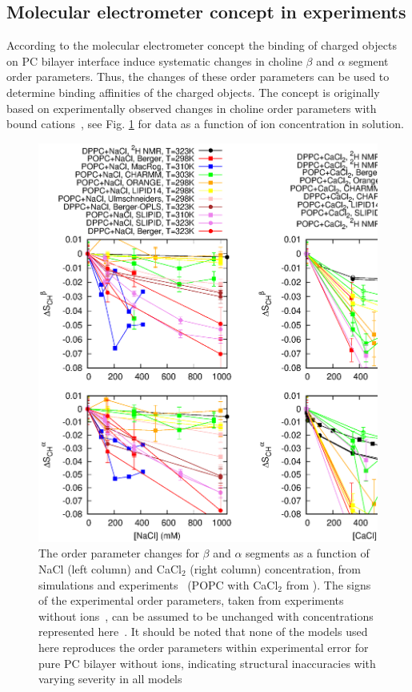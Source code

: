 \documentclass[pre,aps,floatfix,authordate1-4,twocolumn]{revtex4-1}
\begin{document}
\subsection{Molecular electrometer concept in experiments}\label{conceptinexperiments}
According to the molecular electrometer concept the binding of charged objects on 
PC bilayer interface induce systematic changes in choline $\beta$ and $\alpha$
segment order parameters. Thus, the changes of these order parameters can be used
to determine binding affinities of the charged objects. The concept is originally
based on experimentally observed changes in choline order parameters with bound 
cations~\cite{akutsu81,altenbach84}, see Fig. \ref{ordPions} for data as a function
of ion concentration in solution. 
\begin{figure}[]
  \centering
  \includegraphics[width=15cm]{../Fig/OrderParameterIONSchanges.eps}
  \caption{\label{ordPions}
    The order parameter changes for $\beta$ and $\alpha$ segments as a function of NaCl (left column) 
    and CaCl$_2$ (right column) concentration, from simulations and experiments~\cite{akutsu81} 
    (POPC with CaCl$_2$ from \cite{altenbach84}). The signs of the experimental order parameters, taken from
    experiments without ions~\cite{hong95a,hong95b,gross97}, can be assumed to be unchanged 
    with concentrations represented here~\cite{altenbach84,ollila15}. 
    It should be noted that none of the models used here reproduces the order parameters
within experimental error for pure PC bilayer without ions, indicating structural inaccuracies with varying severity in all
models \cite{botan15} %
   }
\end{figure}
\end{document}
